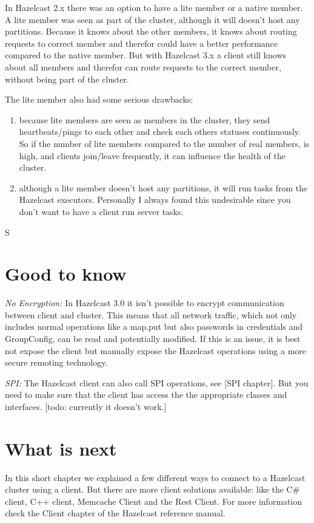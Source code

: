 In Hazelcast 2.x there was an option to have a lite member or a native member. A lite member was seen as part of the cluster, although it will doesn't host any partitions. Because it knows about the other members, it knows about routing requests to correct member and therefor could have a better performance compared to the native member. But with Hazelcast 3.x a client still knows about all members and therefor can route requests to the correct member, without being part of the cluster.

The lite member also had some serious drawbacks:
\begin{enumerate}
\item because lite members are seen as members in the cluster, they send heartbeats/pings to each other and check each others statuses continuously. So if the number of lite members compared to the number of real members, is high, and clients join/leave frequently, it can influence the health of the cluster. 
\item although a lite member doesn't host any partitions, it will run tasks from the Hazelcast executors. Personally I always found this undesirable since you don't want to have a client run server tasks.
\end{enumerate}
S

\section{Good to know}

\emph{No Encryption:} In Hazelcast 3.0 it isn't possible to encrypt communication between client and cluster. This means that all network traffic, which not only includes normal operations like a map.put but also passwords in credentials and GroupConfig, can be read and potentially modified. If this is an issue, it is best not expose the client but manually expose the Hazelcast operations using a more secure remoting technology. 

\emph{SPI:} The Hazelcast client can also call SPI operations, see [SPI chapter]. But you need to make sure that the client has access the the appropriate classes and interfaces.  [todo: currently it doesn't work.]

\section{What is next}
In this short chapter we explained a few different ways to connect to a Hazelcast cluster using a client. But there are more client solutions available: like the C\# client, C++ client, Memcache Client and the Rest Client. For more information check the Client chapter of the Hazelcast reference manual.